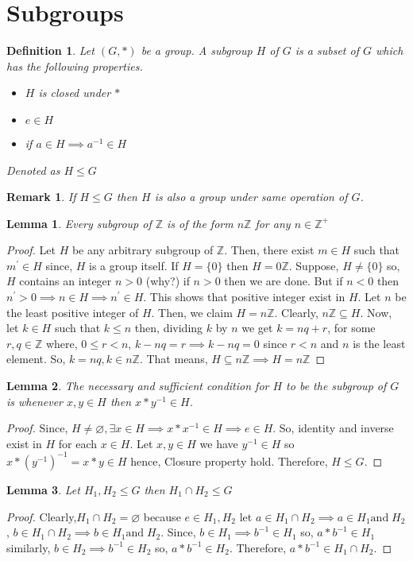 \documentclass[12pt,a4paper]{article}
\newcommand{\Z}{\mathbb{Z}}
\newtheorem{defn}{Definition}
\newtheorem{rem}{Remark}
\newtheorem{lem}{Lemma}
\begin{document}
  \section{Subgroups}
  \begin{defn}
    Let $(G,*)$ be a group. A subgroup $H$ of $G$ is a subset of $G$ which has the following properties.
    \begin{itemize}
      \item $H$ is closed under $*$
      \item $e\in H$
      \item if $a\in H \implies a^{-1}\in H$
    \end{itemize}
    Denoted as $H \leq G$
  \end{defn}
  \begin{rem}
    If $H \leq G$ then $H$ is also a group under same operation of $G$.
  \end{rem}
  \begin{lem}
    Every subgroup of $\Z$ is of the form $n\Z$ for any $n \in \Z^{+}$
  \end{lem}
  \begin{proof}
    Let $H$ be any arbitrary subgroup of $\Z$. Then, there exist $m\in H$ such that $m^{\prime}\in H$ since, $H$ is a group itself. If $H=\{0\}$ then $H=0\Z$. Suppose, $H \neq\{0\}$ so, $H$ contains an integer $n>0$ (why?) if $n>0$ then we are done. But if $n<0$ then $n^{\prime}>0 \implies n\in H \implies n^{\prime}\in H $. This shows that positive integer exist in $H$. Let $n$ be the least positive integer of $H$. Then, we claim $H=n\Z$. Clearly, $n\Z \subseteq H$. Now, let $k\in H$ such that $k \leq n$ then, dividing $k$ by $n$ we get $k=nq+r$, for some $r,q\in \Z$ where, $0\leq r < n$, $k-nq=r \implies k-nq=0$ since $r<n$ and $n$ is the least element. So, $k=nq, k\in n\Z$. That means, $H \subseteq n\Z \implies H=n\Z$
  \end{proof}
  \begin{lem}
    The necessary and sufficient condition for $H$ to be the subgroup of $G$ is whenever $x,y\in H$ then $x*y^{-1} \in H$.
  \end{lem}
  \begin{proof}
    Since, $H \neq \varnothing, \exists x\in H \implies x*x^{-1}\in H \implies e\in H$. So, identity and inverse exist in $H$ for each $x\in H$. Let $x,y \in H$ we have $y^{-1}\in H$ so $x*(y^{-1})^{-1}=x*y\in H$ hence, Closure property hold. Therefore, $H \leq G$.
  \end{proof}
  \begin{lem}
    Let $H_{1},H_{2} \leq G$ then $H_{1} \cap H_{2} \leq G$
  \end{lem}
  \begin{proof}
    Clearly,$H_{1} \cap H_{2}=\varnothing$ because $e\in H_{1},H_{2}$
    let $a\in H_{1} \cap H_{2} \implies a\in H_{1} \text{and}\;H_{2}$,
    $b\in H_{1} \cap H_{2} \implies b\in H_{1} \text{and}\;H_{2}$. Since, $b\in H_{1}\implies b^{-1}\in H_{1}$ so, $a*b^{-1}\in H_{1}$ similarly, $b\in H_{2}\implies b^{-1}\in H_{2}$ so, $a*b^{-1}\in H_{2}$. Therefore, $a*b^{-1}\in H_{1}\cap H_{2}$.
  \end{proof}
\end{document}
